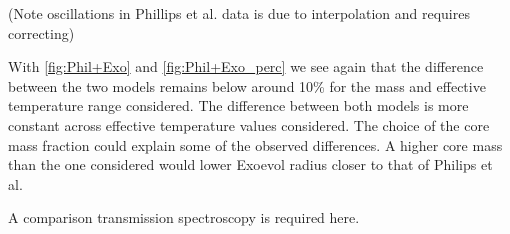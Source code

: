 (Note oscillations in Phillips et al. data is due to interpolation and requires correcting)

With \cref{fig:Phil+Exo} and \cref{fig:Phil+Exo_perc} we see again that the difference between the two models remains below around 10\% for the mass and effective temperature range considered. The difference between both models is more constant across effective temperature values considered. The choice of the core mass fraction could explain some of the observed differences. A higher core mass than the one considered would lower Exoevol radius closer to that of Philips et al. \par

A comparison transmission spectroscopy is required here.


